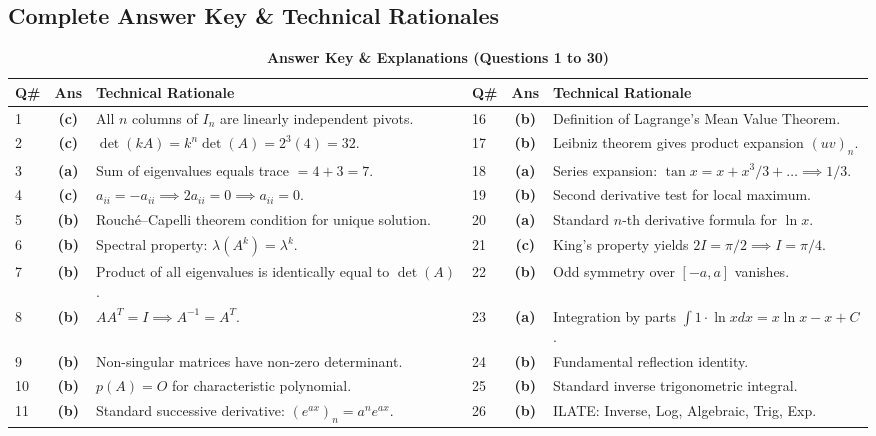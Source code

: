 \newpage
\subsection*{Complete Answer Key \& Technical Rationales}

\begin{table}[htbp]
\centering
\caption{\textbf{Answer Key \& Explanations (Questions 1 to 30)}}
\vspace{2mm}
\begin{tabularx}{\textwidth}{l c X l c X}
\toprule
\textbf{Q\#} & \textbf{Ans} & \textbf{Technical Rationale} & \textbf{Q\#} & \textbf{Ans} & \textbf{Technical Rationale} \\
\midrule
1 & \textbf{(c)} & All $n$ columns of $I_n$ are linearly independent pivots. & 16 & \textbf{(b)} & Definition of Lagrange's Mean Value Theorem. \\
2 & \textbf{(c)} & $\det(kA) = k^n\det(A) = 2^3(4) = 32$. & 17 & \textbf{(b)} & Leibniz theorem gives product expansion $(uv)_n$. \\
3 & \textbf{(a)} & Sum of eigenvalues equals trace $= 4 + 3 = 7$. & 18 & \textbf{(a)} & Series expansion: $\tan x = x + x^3/3 + \dots \implies 1/3$. \\
4 & \textbf{(c)} & $a_{ii} = -a_{ii} \implies 2a_{ii} = 0 \implies a_{ii} = 0$. & 19 & \textbf{(b)} & Second derivative test for local maximum. \\
5 & \textbf{(b)} & Rouch\'e--Capelli theorem condition for unique solution. & 20 & \textbf{(a)} & Standard $n$-th derivative formula for $\ln x$. \\
6 & \textbf{(b)} & Spectral property: $\lambda(A^k) = \lambda^k$. & 21 & \textbf{(c)} & King's property yields $2I = \pi/2 \implies I = \pi/4$. \\
7 & \textbf{(b)} & Product of all eigenvalues is identically equal to $\det(A)$. & 22 & \textbf{(b)} & Odd symmetry over $[-a, a]$ vanishes. \\
8 & \textbf{(b)} & $A A^T = I \implies A^{-1} = A^T$. & 23 & \textbf{(a)} & Integration by parts $\int 1 \cdot \ln x dx = x\ln x - x + C$. \\
9 & \textbf{(b)} & Non-singular matrices have non-zero determinant. & 24 & \textbf{(b)} & Fundamental reflection identity. \\
10 & \textbf{(b)} & $p(A) = O$ for characteristic polynomial. & 25 & \textbf{(b)} & Standard inverse trigonometric integral. \\
11 & \textbf{(b)} & Standard successive derivative: $(e^{ax})_n = a^n e^{ax}$. & 26 & \textbf{(b)} & ILATE: Inverse, Log, Algebraic, Trig, Exp. \\

\end{tabularx}
\end{table}
